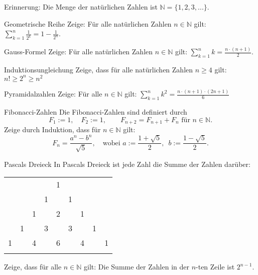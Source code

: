 \documentclass{uebungszettel}
\newcommand{\N}{\mathbb{N}} %
\begin{document}
\pagestyle{empty}


Erinnerung: Die Menge der natürlichen Zahlen ist $\N = \{ 1, 2, 3, ... \}$.

\begin{aufgabe}{Geometrische Reihe}
  Zeige: Für alle natürlichen Zahlen $n \in \N$ gilt: \enspace $\sum\limits_{k=1}^n \frac{1}{2^k} = 1 - \frac{1}{2^n}$.
\end{aufgabe}

\begin{aufgabe}{Gauss-Formel}
  Zeige: Für alle natürlichen Zahlen $n \in \N$ gilt: \enspace $\sum\limits_{k=1}^n k = \frac{n \cdot (n+1)}{2}$.
\end{aufgabe}

\begin{aufgabe}{Induktionsungleichung}
  Zeige, dass für alle natürlichen Zahlen $n \geq 4$ gilt: \enspace $n! \geq 2^n \geq n^2$
\end{aufgabe}

\begin{aufgabe}{Pyramidalzahlen}
  Zeige: Für alle $n \in \N$ gilt: $\sum\limits_{k=1}^{n} k^2 = \frac{n \cdot (n+1) \cdot (2n+1)}{6}$
\end{aufgabe}

\begin{aufgabe}{Fibonacci-Zahlen}
  Die Fibonacci-Zahlen sind definiert durch
  \[ F_1 := 1, \quad F_2 := 1, \quad \quad F_{n+2} = F_{n+1} + F_n \text{ für $n \in \N$}. \]
  Zeige durch Induktion, dass für $n \in \N$ gilt:
  \[
    F_n = \frac{a^n - b^n}{\sqrt{5}}, \quad \text{wobei }
    a := \frac{1 + \sqrt{5}}{2}, \enspace
    b := \frac{1 - \sqrt{5}}{2}.
  \]
\end{aufgabe}

\begin{aufgabe}{Pascals Dreieck}
  In Pascals Dreieck ist jede Zahl die Summe der Zahlen darüber:

  \begin{center}
    \begin{tabular}{ccccccccc}
      & & & & 1 \\ \noalign{\smallskip\smallskip}
      & & & 1 & & 1 \\ \noalign{\smallskip\smallskip}
      & & 1 & & 2 & & 1 \\ \noalign{\smallskip\smallskip}
      & 1 & & 3 & & 3 & & 1 \\ \noalign{\smallskip\smallskip}
      1 & & 4 & & 6 & & 4 & & 1 \\ \noalign{\smallskip\smallskip}
    \end{tabular}
  \end{center}

  Zeige, dass für alle $n \in \N$ gilt: Die Summe der Zahlen in der $n$-ten Zeile ist $2^{n-1}$.
\end{aufgabe}
\end{document}
